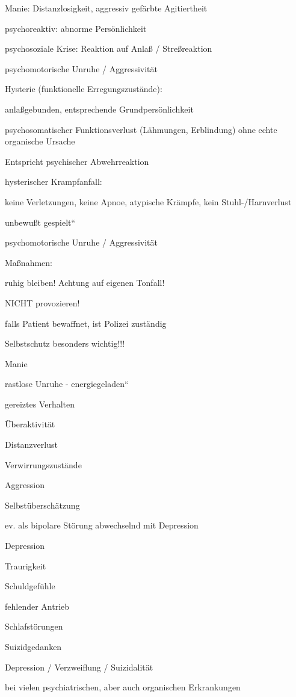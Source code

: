 \documentclass{article}
\begin{document}
Manie: Distanzlosigkeit, aggressiv gef\"arbte Agitiertheit

psychoreaktiv: abnorme Pers\"onlichkeit

psychosoziale Krise: Reaktion auf Anla{\ss} / Stre{\ss}reaktion

psychomotorische Unruhe /  Aggressivit\"at

Hysterie (funktionelle Erregungszust\"ande):

anla{\ss}gebunden, entsprechende Grundpers\"onlichkeit

psychosomatischer Funktionsverlust (L\"ahmungen, Erblindung) ohne echte
organische Ursache

Entspricht psychischer Abwehrreaktion

hysterischer Krampfanfall:

keine Verletzungen, keine Apnoe, atypische Kr\"ampfe, kein
Stuhl-/Harnverlust

unbewu{\ss}t {\quotedblbase}gespielt{\textquotedblleft}

psychomotorische Unruhe /  Aggressivit\"at

Ma{\ss}nahmen:

ruhig bleiben! Achtung auf eigenen Tonfall!

NICHT provozieren!

falls Patient bewaffnet, ist Polizei zust\"andig

Selbstschutz besonders wichtig!!!

Manie

rastlose Unruhe - {\quotedblbase}energiegeladen{\textquotedblleft}

gereiztes Verhalten

\"Uberaktivit\"at

Distanzverlust

Verwirrungszust\"ande

Aggression

Selbst\"ubersch\"atzung

ev. als bipolare St\"orung abwechselnd mit  Depression

Depression

Traurigkeit

Schuldgef\"uhle

fehlender Antrieb

Schlafst\"orungen

Suizidgedanken

Depression / Verzweiflung / Suizidalit\"at

bei vielen psychiatrischen, aber auch  organischen Erkrankungen
\end{document}
